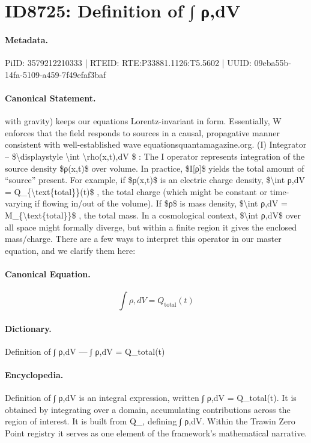 \section*{ID8725: Definition of ∫ ρ,dV}
\paragraph{Metadata.}
PiID: 3579212210333 | RTEID: RTE:P33881.1126:T5.5602 | UUID: 09eba55b-14fa-5109-a459-7f49efaf3baf

\paragraph{Canonical Statement.}
with gravity) keeps our equations Lorentz-invariant in form. Essentially, W enforces that the field responds to sources in a causal, propagative manner consistent with well-established wave equationsquantamagazine.org. (I) Integrator – \$\textbackslash{}displaystyle \textbackslash{}int \textbackslash{}rho(x,t),dV \$ : The I operator represents integration of the source density \$ρ(x,t)\$ over volume. In practice, \$I[ρ]\$ yields the total amount of “source” present. For example, if \$ρ(x,t)\$ is an electric charge density, \$\textbackslash{}int ρ,dV = Q\_\{\textbackslash{}text\{total\}\}(t)\$ , the total charge (which might be constant or time-varying if flowing in/out of the volume). If \$ρ\$ is mass density, \$\textbackslash{}int ρ,dV = M\_\{\textbackslash{}text\{total\}\}\$ , the total mass. In a cosmological context, \$\textbackslash{}int ρ,dV\$ over all space might formally diverge, but within a finite region it gives the enclosed mass/charge. There are a few ways to interpret this operator in our master equation, and we clarify them here:

\paragraph{Canonical Equation.}
\[
\int ρ,dV = Q_{\text{total}}(t)
\]

\paragraph{Dictionary.}
Definition of ∫ ρ,dV — ∫ ρ,dV = Q\_total(t)

\paragraph{Encyclopedia.}
Definition of ∫ ρ,dV is an integral expression, written ∫ ρ,dV = Q\_total(t). It is obtained by integrating over a domain, accumulating contributions across the region of interest. It is built from Q\_, defining ∫ ρ,dV. Within the Trawin Zero Point registry it serves as one element of the framework's mathematical narrative.
